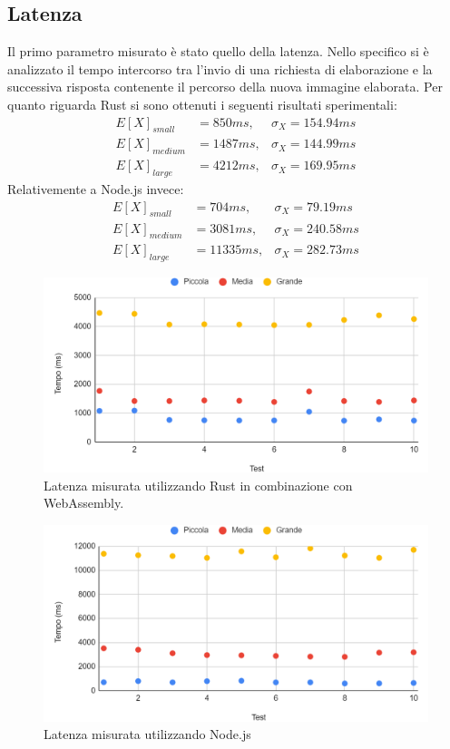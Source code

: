 \subsection{Latenza}
Il primo parametro misurato è stato quello della latenza.
Nello specifico si è analizzato il tempo intercorso tra l'invio di una richiesta di elaborazione e la successiva risposta contenente il percorso della nuova immagine elaborata.
Per quanto riguarda Rust si sono ottenuti i seguenti risultati sperimentali:
\begin{align*}
    E[X]_{small}&=850ms,  & \sigma_X=154.94ms\\
    E[X]_{medium}&=1487ms, & \sigma_X=144.99ms\\
    E[X]_{large}&=4212ms,  & \sigma_X=169.95ms
\end{align*}
Relativemente a Node.js invece:
\begin{align*}
    E[X]_{small}&=704ms,  & \sigma_X=79.19ms\\
    E[X]_{medium}&=3081ms, & \sigma_X=240.58ms\\
    E[X]_{large}&=11335ms,  & \sigma_X=282.73ms
\end{align*}
\begin{figure}
    \begin{center}
            \includegraphics[width=1\columnwidth]{images/rust_latenza.png}
    \end{center}
    \caption{Latenza misurata utilizzando Rust in combinazione con WebAssembly.}
\end{figure}
\begin{figure}
    \begin{center}
            \includegraphics[width=1\columnwidth]{images/node_latenza.png}
    \end{center}
    \caption{Latenza misurata utilizzando Node.js}
\end{figure}
